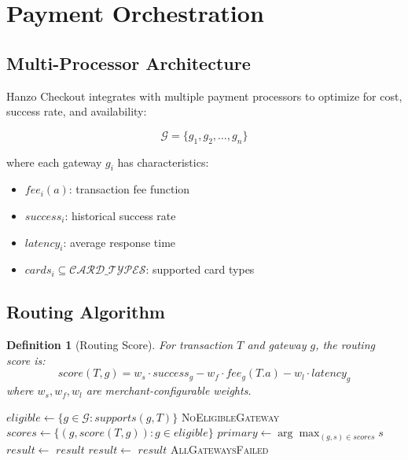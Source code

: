 \documentclass[11pt,a4paper]{article}
\newtheorem{definition}[theorem]{Definition}
\begin{document}
\section{Payment Orchestration}

\subsection{Multi-Processor Architecture}

Hanzo Checkout integrates with multiple payment processors to optimize for cost, success rate, and availability:

\begin{equation}
\mathcal{G} = \{g_1, g_2, \ldots, g_n\}
\end{equation}

where each gateway $g_i$ has characteristics:
\begin{itemize}
    \item $fee_i(a)$: transaction fee function
    \item $success_i$: historical success rate
    \item $latency_i$: average response time
    \item $cards_i \subseteq \mathcal{CARD\_TYPES}$: supported card types
\end{itemize}

\subsection{Routing Algorithm}

\begin{definition}[Routing Score]
For transaction $T$ and gateway $g$, the routing score is:
\begin{equation}
score(T, g) = w_s \cdot success_g - w_f \cdot fee_g(T.a) - w_l \cdot latency_g
\end{equation}
where $w_s, w_f, w_l$ are merchant-configurable weights.
\end{definition}

\begin{algorithm}
\caption{Intelligent Payment Routing}
\begin{algorithmic}[1]
    \State $eligible \gets \{g \in \mathcal{G} : supports(g, T)\}$
        \State \Return \textsc{NoEligibleGateway}
    \EndIf
    \State $scores \gets \{(g, score(T, g)) : g \in eligible\}$
    \State $primary \gets \arg\max_{(g,s) \in scores} s$
    \State $result \gets$ 
        \State \Return $result$
    \EndIf
    \State {}
        \State $result \gets$ 
            \State \Return $result$
        \EndIf
    \EndFor
    \State \Return \textsc{AllGatewaysFailed}
\EndFunction
\end{algorithmic}
\end{algorithm}
\end{document}
